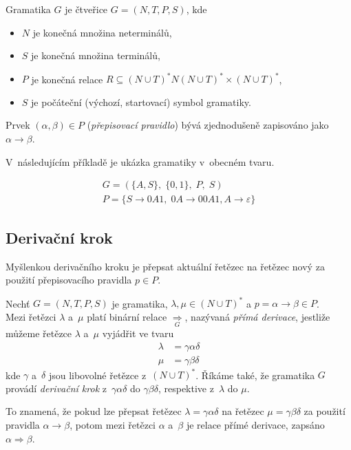 \begin{definition}\label{def_gramatika}
    Gramatika $G$ je čtveřice $G = (N, T, P, S)$, kde
    \begin{itemize}
        \item $N$ je konečná množina neterminálů,
        \item $S$ je konečná množina terminálů,
        \item $P$ je konečná relace $R \subseteq (N \cup T)^*N(N \cup T)^* \times (N \cup T)^*$,
        \item $S$ je počáteční (výchozí, startovací) symbol gramatiky.
    \end{itemize}
    Prvek $(\alpha, \beta) \in P$ (\emph{přepisovací pravidlo}) bývá zjednodušeně zapisováno jako $\alpha \rightarrow \beta$.
\end{definition}
V~následujícím příkladě je ukázka gramatiky v~obecném tvaru.
\begin{example}
    \begin{gather*}
        G = (\{A, S\},\; \{0, 1\},\; P,\; S) \\
        P = \{S \rightarrow 0A1,\; 0A \rightarrow 00A1, A \rightarrow \varepsilon\}
    \end{gather*}
\end{example}

\subsection*{Derivační krok}\label{kap_der_krok}
Myšlenkou derivačního kroku je přepsat aktuální řetězec na řetězec nový za použití přepisovacího pravidla $p \in P$.
\begin{definition}\label{def_derivacni_krok}
    Nechť $G = (N, T, P, S)$ je gramatika, $\lambda, \mu  \in (N \cup T)^*$ a $p = \alpha \rightarrow \beta \in P$. \\
    Mezi řetězci $\lambda$ a~$\mu$ platí binární relace $\underset{\scriptscriptstyle G}{\Rightarrow}$, nazývaná \emph{přímá derivace}, jestliže můžeme řetězce $\lambda$ a~$\mu$ vyjádřit ve tvaru
    \begin{align*}
        \lambda &= \gamma \alpha \delta \\
        \mu &= \gamma \beta \delta 
    \end{align*}
    kde $\gamma$ a~$\delta$ jsou libovolné řetězce z~$(N \cup T)^*$. 
    Říkáme také, že gramatika $G$ provádí \emph{derivační krok} z~$\gamma \alpha \delta$ do $\gamma \beta \delta$, respektive z~$\lambda$ do $\mu$.
\end{definition}
To znamená, že pokud lze přepsat řetězec $\lambda = \gamma \alpha \delta$ na řetězec $\mu = \gamma \beta \delta$ za použití pravidla $\alpha \rightarrow \beta$, potom mezi řetězci $\alpha$ a~$\beta$ je relace přímé derivace, zapsáno $\alpha \Rightarrow \beta$.

